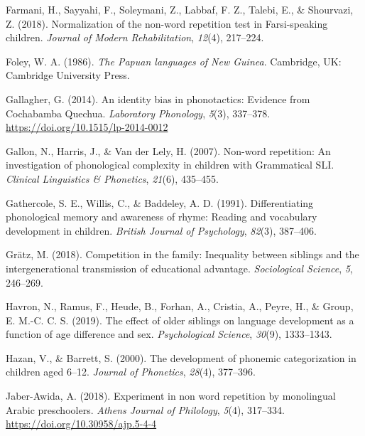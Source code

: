 \documentclass[english,,man,floatsintext]{apa6}
\begin{document}
\leavevmode\hypertarget{ref-farmani2018normalization}{}%
Farmani, H., Sayyahi, F., Soleymani, Z., Labbaf, F. Z., Talebi, E., \& Shourvazi, Z. (2018). Normalization of the non-word repetition test in Farsi-speaking children. \emph{Journal of Modern Rehabilitation}, \emph{12}(4), 217--224.

\leavevmode\hypertarget{ref-foley1986papuan}{}%
Foley, W. A. (1986). \emph{The Papuan languages of New Guinea}. Cambridge, UK: Cambridge University Press.

\leavevmode\hypertarget{ref-gallagher2014identity}{}%
Gallagher, G. (2014). An identity bias in phonotactics: Evidence from Cochabamba Quechua. \emph{Laboratory Phonology}, \emph{5}(3), 337--378. \url{https://doi.org/10.1515/lp-2014-0012}

\leavevmode\hypertarget{ref-gallon2007non}{}%
Gallon, N., Harris, J., \& Van der Lely, H. (2007). Non-word repetition: An investigation of phonological complexity in children with Grammatical SLI. \emph{Clinical Linguistics \& Phonetics}, \emph{21}(6), 435--455.

\leavevmode\hypertarget{ref-gathercole1991differentiating}{}%
Gathercole, S. E., Willis, C., \& Baddeley, A. D. (1991). Differentiating phonological memory and awareness of rhyme: Reading and vocabulary development in children. \emph{British Journal of Psychology}, \emph{82}(3), 387--406.

\leavevmode\hypertarget{ref-gratz2018competition}{}%
Grätz, M. (2018). Competition in the family: Inequality between siblings and the intergenerational transmission of educational advantage. \emph{Sociological Science}, \emph{5}, 246--269.

\leavevmode\hypertarget{ref-havron2019effect}{}%
Havron, N., Ramus, F., Heude, B., Forhan, A., Cristia, A., Peyre, H., \& Group, E. M.-C. C. S. (2019). The effect of older siblings on language development as a function of age difference and sex. \emph{Psychological Science}, \emph{30}(9), 1333--1343.

\leavevmode\hypertarget{ref-hazan2000development}{}%
Hazan, V., \& Barrett, S. (2000). The development of phonemic categorization in children aged 6--12. \emph{Journal of Phonetics}, \emph{28}(4), 377--396.

\leavevmode\hypertarget{ref-jabere2018xperiment}{}%
Jaber-Awida, A. (2018). Experiment in non word repetition by monolingual Arabic preschoolers. \emph{Athens Journal of Philology}, \emph{5}(4), 317--334. \url{https://doi.org/10.30958/ajp.5-4-4}
\end{document}
